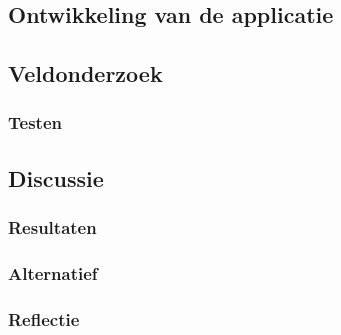 
\chapter{}%
\label{ch:proof-of-concept}


\section{Ontwikkeling van de applicatie}
\label{sec:ontwikkeling van de applicatie}

\section{Veldonderzoek}
\label{sec:veldonderzoek}

\subsection{Testen}
\label{sec:testen}

\section{Discussie}
\label{sec:discussie}

\subsection{Resultaten}
\label{sec:resultaten}

\subsection{Alternatief}
\label{sec:alternatief}

\subsection{Reflectie}
\label{sec:reflectie}